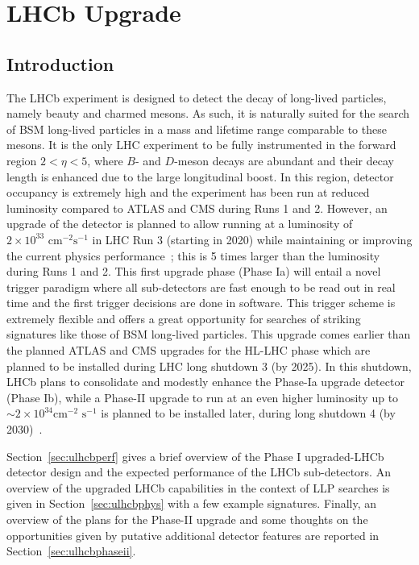 \section{LHCb Upgrade}\label{sec:LHCb_upgrade}
\subsection{Introduction}

The LHCb experiment is designed to detect the decay of long-lived particles, namely beauty and charmed mesons. As such, it is naturally suited for the search of BSM long-lived particles in a mass and lifetime range comparable to these mesons. It is the only LHC experiment to be fully instrumented in the forward region $2<\eta<5$, where $B$- and $D$-meson decays are abundant and their decay length is enhanced due to the large longitudinal boost. In this region, detector occupancy is extremely
high and the experiment has been run at reduced luminosity compared to ATLAS and CMS during Runs 1 and 2. However, an upgrade of the detector is planned to allow running at a luminosity of $2\times 10^{33}\,\,\text{cm}^{-2}\text{s}^{-1}$ in LHC Run 3 (starting in 2020) while maintaining or improving the current physics performance~\cite{LHCbUpgradeTDR}; this is 5 times larger than the luminosity during Runs 1 and 2. This first upgrade phase (Phase Ia) will entail a novel trigger paradigm where
all sub-detectors are fast enough to be read out in real time and the first trigger decisions are done in software. This trigger scheme is  extremely flexible and offers a great opportunity for searches of striking signatures like those of BSM long-lived particles. This upgrade comes earlier than the planned ATLAS and CMS upgrades for the HL-LHC phase which are planned to be installed during LHC long shutdown 3 (by 2025). In this shutdown, LHCb plans to consolidate and modestly enhance
the Phase-Ia upgrade detector (Phase Ib), while a Phase-II upgrade to run at an even higher luminosity up to $\sim 2\times 10^{34}\text{cm}^{-2}\,\,\text{s}^{-1}$ is planned to be installed later, during long shutdown 4 (by 2030)~\cite{LHCbUpgradeIIPC}. 

Section~\ref{sec:ulhcbperf} gives a brief overview of the Phase I upgraded-LHCb detector design and the expected performance of the LHCb sub-detectors. 
An overview of the upgraded LHCb capabilities in the context of LLP searches is given in Section~\ref{sec:ulhcbphys} with a few example signatures. 
Finally, an overview of the plans for the Phase-II upgrade and some thoughts on the opportunities given by putative additional detector features are reported in Section~\ref{sec:ulhcbphaseii}.



